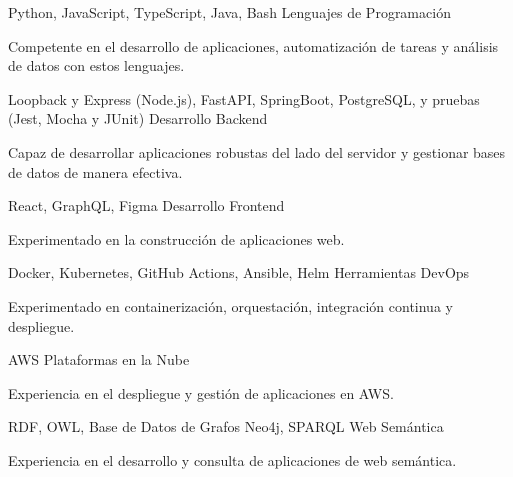 \begin{cventries}
  \cventry
  {Python, JavaScript, TypeScript, Java, Bash}
  {Lenguajes de Programación}
  {}
  {}
  {
    \begin{cvitems}
      \item {Competente en el desarrollo de aplicaciones, automatización de tareas y análisis de datos con estos lenguajes.}
    \end{cvitems}
  }
  \cventry
  {Loopback y Express (Node.js), FastAPI, SpringBoot, PostgreSQL, y pruebas (Jest, Mocha y JUnit)}
  {Desarrollo Backend}
  {}
  {}
  {
    \begin{cvitems}
      \item{Capaz de desarrollar aplicaciones robustas del lado del servidor y gestionar bases de datos de manera efectiva.}
    \end{cvitems}
  }
  \cventry
  {React, GraphQL, Figma}
  {Desarrollo Frontend}
  {}
  {}
  {
    \begin{cvitems}
      \item {Experimentado en la construcción de aplicaciones web.}
    \end{cvitems}
  }
  \cventry
  {Docker, Kubernetes, GitHub Actions, Ansible, Helm}
  {Herramientas DevOps}
  {}
  {}
  {
    \begin{cvitems}
      \item {Experimentado en containerización, orquestación, integración continua y despliegue.}
    \end{cvitems}
  }
  \cventry
  {AWS}
  {Plataformas en la Nube}
  {}
  {}
  {
    \begin{cvitems}
      \item {Experiencia en el despliegue y gestión de aplicaciones en AWS.}
    \end{cvitems}
  }
  \cventry
  {RDF, OWL, Base de Datos de Grafos Neo4j, SPARQL}
  {Web Semántica}
  {}
  {}
  {
    \begin{cvitems}
      \item {Experiencia en el desarrollo y consulta de aplicaciones de web semántica.}
    \end{cvitems}
  }
\end{cventries}